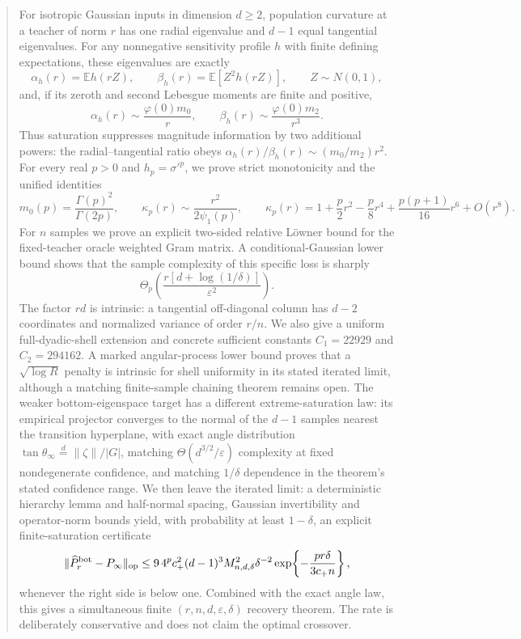 \documentclass[11pt]{article}
\newcommand{\E}{\mathbb E}
\begin{document}
\begin{abstract}
For isotropic Gaussian inputs in dimension $d\ge2$, population curvature at a teacher of norm $r$ has one radial
eigenvalue and $d-1$ equal tangential eigenvalues.  For any nonnegative sensitivity profile $h$ with finite defining expectations, these
eigenvalues are exactly
\[
 \alpha_h(r)=\E h(rZ),\qquad \beta_h(r)=\E[Z^2h(rZ)],\qquad Z\sim N(0,1),
\]
and, if its zeroth and second Lebesgue moments are finite and positive,
\[
 \alpha_h(r)\sim \frac{\varphi(0)m_0}{r},\qquad
 \beta_h(r)\sim \frac{\varphi(0)m_2}{r^3}.
\]
Thus saturation suppresses magnitude information by two additional powers: the radial--tangential ratio obeys
$\alpha_h(r)/\beta_h(r)\sim(m_0/m_2)r^2$.  For every real $p>0$ and
$h_p=\sigma'^p$, we prove strict monotonicity and the unified identities
\[
 m_0(p)=\frac{\Gamma(p)^2}{\Gamma(2p)},\qquad
 \kappa_p(r)\sim\frac{r^2}{2\psi_1(p)},\qquad
 \kappa_p(r)=1+\frac p2r^2-\frac p8r^4+\frac{p(p+1)}{16}r^6+O(r^8).
\]
For $n$ samples we prove an explicit two-sided relative L\"owner bound for the fixed-teacher oracle weighted
Gram matrix.  A conditional-Gaussian lower bound shows that the sample complexity of this specific loss is sharply
\[
 \Theta_p\!\left(\frac{r[d+\log(1/\delta)]}{\varepsilon^2}\right).
\]
The factor $rd$ is intrinsic: a tangential off-diagonal column has $d-2$ coordinates and normalized variance of
order $r/n$.  We also give a uniform full-dyadic-shell extension and concrete sufficient constants
$C_1=22929$ and $C_2=294162$.  A marked angular-process lower bound proves that a $\sqrt{\log R}$ penalty is
intrinsic for shell uniformity in its stated iterated limit, although a matching finite-sample chaining theorem
remains open.  The weaker bottom-eigenspace target has a different extreme-saturation law:
its empirical projector converges to the normal of the $d-1$ samples nearest the transition hyperplane, with exact
angle distribution $\tan\theta_\infty\stackrel d=\lVert\zeta\rVert/|G|$, matching
$\Theta(d^{3/2}/\varepsilon)$ complexity at fixed nondegenerate confidence, and matching $1/\delta$ dependence
in the theorem's stated confidence range.  We then leave the iterated limit: a deterministic hierarchy lemma and
half-normal spacing, Gaussian invertibility and operator-norm bounds yield, with probability at least $1-\delta$,
an explicit finite-saturation certificate
\[
 \lVert\widehat P_r^{\rm bot}-P_\infty\rVert_{\rm op}
 \le 9\,4^pc_+^2(d-1)^3M_{n,d,\delta}^2\delta^{-2}
 \exp\!\left\{-\frac{pr\delta}{3c_+n}\right\},
\]
whenever the right side is below one.  Combined with the exact angle law, this gives a simultaneous finite
$(r,n,d,\varepsilon,\delta)$ recovery theorem.  The rate is deliberately conservative and does not claim the
optimal crossover.


\end{abstract}
\end{document}
